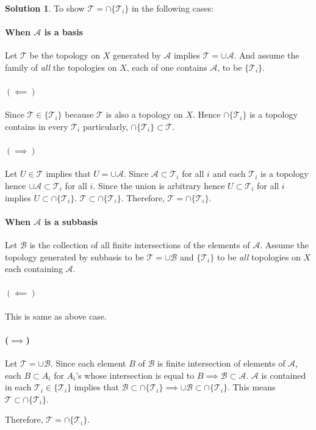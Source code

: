 \documentclass[12pt,reqno]{amsart}
\theoremstyle{plain}
\theoremstyle{definition}
\newtheorem*{sol*}{Solution}
\newcommand{\cal}[1]{\mathcal{#1}}
\begin{document}
\begin{sol*}
    To show $\cal T = \cap \{\cal T_i\}$ in the following cases:
    \paragraph{\bf When $\cal A$ is a basis} Let $\cal T$ be the topology on $X$ generated by $\cal A$ implies $\cal T = \cup \cal A$. And assume the family of {\it all} the topologies on $X$, each of one contains $\cal A$, to be $\{\cal T_i\}$. 
    \paragraph{$(\impliedby)$} Since $\cal T \in \{\cal T_i\}$ because $\cal T$ is also a topology on $X$. Hence $\cap \{\cal T_i\}$ is a topology contains in every $\cal T_i$ particularly, $\cap\{\cal T_i\} \subset \cal T$.
    \paragraph{$(\implies)$} Let $U \in \cal T$ implies that $U = \cup \cal A$. Since $\cal A \subset \cal T_i$ for all $i$ and each $\cal T_i$ is a topology hence $\cup \cal A \subset \cal T_i$ for all $i$. Since the union is arbitrary hence $U \subset \cal T_i$ for all $i$ implies $U \subset \cap \{\cal T_i\}$. $\cal T \subset \cap \{\cal T_i\}$. Therefore, $\cal T = \cap \{\cal T_i\}$.
    \paragraph{\bf When $\cal A$ is a subbasis} Let $\cal B$ is the collection of all finite intersections of the elements of $\cal A$. Assume the topology generated by subbasis to be $\cal T = \cup \cal B$ and $\{\cal T_i\}$ to be {\it all} topologies on $X$ each containing $\cal A$.

    \paragraph{$(\impliedby)$} This is same as above case.

    \paragraph{($\implies$)} Let $\cal T = \cup \cal B$. Since each element $B$ of $\cal B$ is finite intersection of elements of $\cal A$, each $B \subset A_i$ for $A_i$'s whose intersection is equal to $B \implies \cal B \subset \cal A$. $\cal A$ is contained in each $\cal T_i \in \{\cal T_i\}$ implies that $\cal B \subset \cap \{\cal T_i\} \implies \cup \cal B \subset \cap \{\cal T_i\}$. This means $\cal T \subset \cap \{\cal T_i\}$.
    \par Therefore, $\cal T = \cap \{\cal T_i\}$.
\end{sol*}
\end{document}
